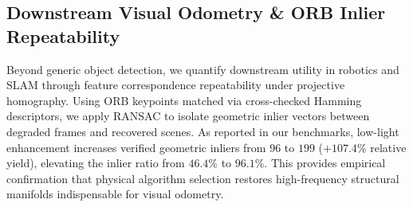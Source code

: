 \documentclass[journal]{IEEEtran}
\begin{document}
\begin{table}[!t]
\centering
\caption{Classification vs. Predict-Then-Optimize (PTO) Formulation}
\label{tab:pto_comparison}
\end{table}

\subsection{Downstream Visual Odometry \& ORB Inlier Repeatability}
Beyond generic object detection, we quantify downstream utility in robotics and SLAM through feature correspondence repeatability under projective homography. Using ORB keypoints matched via cross-checked Hamming descriptors, we apply RANSAC to isolate geometric inlier vectors between degraded frames and recovered scenes.
As reported in our benchmarks, low-light enhancement increases verified geometric inliers from $96$ to $199$ ($+107.4\%$ relative yield), elevating the inlier ratio from $46.4\%$ to $\mathbf{96.1\%}$. This provides empirical confirmation that physical algorithm selection restores high-frequency structural manifolds indispensable for visual odometry.
\end{document}
